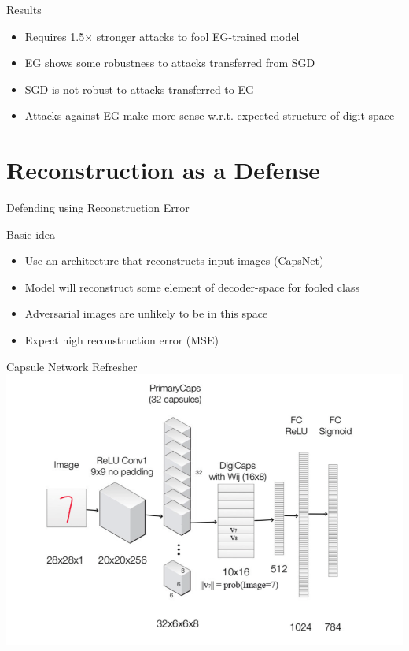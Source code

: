 \documentclass{beamer}
\begin{document}
	\begin{frame}{Results}
		\begin{itemize}
			\item Requires 1.5$\times$ stronger attacks to fool EG-trained model
			\item EG shows some robustness to attacks transferred from SGD
			\item SGD is not robust to attacks transferred to EG
			\item Attacks against EG make more sense w.r.t. expected structure of digit space
		\end{itemize}
	\end{frame}

	\section*{Reconstruction as a Defense}
	
	\begin{frame}{Defending using Reconstruction Error}
		\begin{block}{Basic idea}
			\begin{itemize}
				\item Use an architecture that reconstructs input images (CapsNet)
				\item Model will reconstruct some element of decoder-space for fooled class
				\item Adversarial images are unlikely to be in this space
				\item Expect high reconstruction error (MSE)
			\end{itemize}
		\end{block}
	\end{frame}
	
	\begin{frame}{Capsule Network Refresher}
		\centering
		\includegraphics[width=\textwidth]{caps_recon}
	\end{frame}
	
\end{document}
